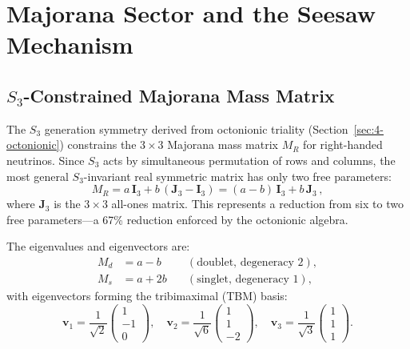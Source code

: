 \section{Majorana Sector and the Seesaw Mechanism}
\label{sec:4-majorana}

\subsection{$S_3$-Constrained Majorana Mass Matrix}
\label{sec:4-s3-majorana}

The $S_3$ generation symmetry derived from octonionic triality (Section~\ref{sec:4-octonionic}) constrains the $3 \times 3$ Majorana mass matrix $M_R$ for right-handed neutrinos. Since $S_3$ acts by simultaneous permutation of rows and columns, the most general $S_3$-invariant real symmetric matrix has only two free parameters:
\begin{equation}
  M_R = a\, \mathbf{I}_3 + b\, (\mathbf{J}_3 - \mathbf{I}_3) = (a - b)\, \mathbf{I}_3 + b\, \mathbf{J}_3\,,
  \label{eq:4-105}
\end{equation}
where $\mathbf{J}_3$ is the $3 \times 3$ all-ones matrix. This represents a reduction from six to two free parameters---a 67\% reduction enforced by the octonionic algebra.

The eigenvalues and eigenvectors are:
\begin{equation}
\begin{aligned}
  M_d &= a - b \quad &(\text{doublet, degeneracy 2}),\\
  M_s &= a + 2b \quad &(\text{singlet, degeneracy 1}),
\end{aligned}
  \label{eq:4-106}
\end{equation}
with eigenvectors forming the tribimaximal (TBM) basis:
\begin{equation}
  \mathbf{v}_1 = \frac{1}{\sqrt{2}}\begin{pmatrix} 1\\-1\\0 \end{pmatrix}, \quad
  \mathbf{v}_2 = \frac{1}{\sqrt{6}}\begin{pmatrix} 1\\1\\-2 \end{pmatrix}, \quad
  \mathbf{v}_3 = \frac{1}{\sqrt{3}}\begin{pmatrix} 1\\1\\1 \end{pmatrix}.
  \label{eq:4-107}
\end{equation}

